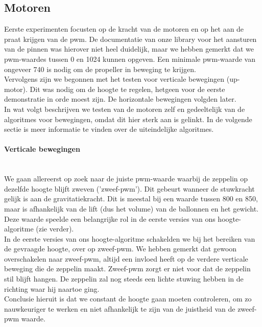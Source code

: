 \documentclass[eind]{penoverslag}
\begin{document}
\subsection{Motoren}
Eerste experimenten focusten op de kracht van de motoren en op het aan de praat krijgen van de pwm. De documentatie van onze library voor het aansturen van de pinnen was hierover niet heel duidelijk, maar we hebben gemerkt dat we pwm-waardes tussen 0 en 1024 kunnen opgeven. Een minimale pwm-waarde van ongeveer 740 is nodig om de propeller in beweging te krijgen. \\

Vervolgens zijn we begonnen met het testen voor verticale bewegingen (up-motor). Dit was nodig om de hoogte te regelen, hetgeen voor de eerste demonstratie in orde moest zijn. De horizontale bewegingen volgden later. \\

In wat volgt beschrijven we testen van de motoren zelf en gedeeltelijk van de algoritmes voor bewegingen, omdat dit hier sterk aan is gelinkt. In de volgende sectie is meer informatie te vinden over de uiteindelijke algoritmes.

\paragraph{Verticale bewegingen} ~\\ 
We gaan allereerst op zoek naar de juiste pwm-waarde waarbij de zeppelin op dezelfde hoogte blijft zweven ('zweef-pwm').  Dit gebeurt wanneer de stuwkracht gelijk is aan de gravitatiekracht. Dit is meestal bij een waarde tussen 800 en 850, maar is afhankelijk van de lift (dus het volume) van de ballonnen en het gewicht. Deze waarde speelde een belangrijke rol in de eerste versies van ons hoogte-algoritme (zie verder). \\

In de eerste versies van ons hoogte-algoritme schakelden we bij het bereiken van de gevraagde hoogte, over op zweef-pwm. We hebben gemerkt dat gewoon overschakelen naar zweef-pwm, altijd een invloed heeft op de verdere verticale beweging die de zeppelin maakt. Zweef-pwm zorgt er niet voor dat de zeppelin stil blijft hangen. De zeppelin zal nog steeds een lichte stuwing hebben in de richting waar hij naartoe ging. \\

Conclusie hieruit is dat we constant de hoogte gaan moeten controleren, om zo nauwkeuriger te werken en niet afhankelijk te zijn van de juistheid van de zweef-pwm waarde. \\
\end{document}
